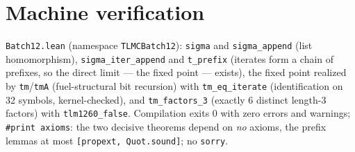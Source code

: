 \documentclass[11pt]{article}
\theoremstyle{definition}
\theoremstyle{remark}
\begin{document}
\section{Machine verification}
\texttt{Batch12.lean} (namespace \texttt{TLMCBatch12}): \texttt{sigma} and \texttt{sigma\_append} (list homomorphism), \texttt{sigma\_iter\_append} and \texttt{t\_prefix} (iterates form a chain of prefixes, so the direct limit --- the fixed point --- exists), the fixed point realized by \texttt{tm}/\texttt{tmA} (fuel-structural bit recursion) with \texttt{tm\_eq\_iterate} (identification on 32 symbols, kernel-checked), and \texttt{tm\_factors\_3} (exactly 6 distinct length-3 factors) with \texttt{tlm1260\_false}. Compilation exits $0$ with zero errors and warnings; \texttt{\#print axioms}: the two decisive theorems depend on \emph{no} axioms, the prefix lemmas at most \texttt{[propext, Quot.sound]}; no \texttt{sorry}.
\end{document}
